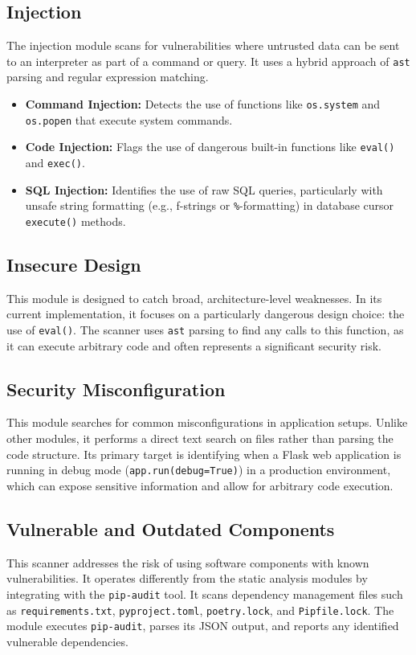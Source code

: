 \subsection{Injection}
The injection module scans for vulnerabilities where untrusted data can be sent to an interpreter as part of a command or query. It uses a hybrid approach of \texttt{ast} parsing and regular expression matching.
\begin{itemize}
    \item \textbf{Command Injection:} Detects the use of functions like \texttt{os.system} and \texttt{os.popen} that execute system commands.
    \item \textbf{Code Injection:} Flags the use of dangerous built-in functions like \texttt{eval()} and \texttt{exec()}.
    \item \textbf{SQL Injection:} Identifies the use of raw SQL queries, particularly with unsafe string formatting (e.g., f-strings or \texttt{\%}-formatting) in database cursor \texttt{execute()} methods.
\end{itemize}

\subsection{Insecure Design}
This module is designed to catch broad, architecture-level weaknesses. In its current implementation, it focuses on a particularly dangerous design choice: the use of \texttt{eval()}. The scanner uses \texttt{ast} parsing to find any calls to this function, as it can execute arbitrary code and often represents a significant security risk.

\subsection{Security Misconfiguration}
This module searches for common misconfigurations in application setups. Unlike other modules, it performs a direct text search on files rather than parsing the code structure. Its primary target is identifying when a Flask web application is running in debug mode (\texttt{app.run(debug=True)}) in a production environment, which can expose sensitive information and allow for arbitrary code execution.

\subsection{Vulnerable and Outdated Components}
This scanner addresses the risk of using software components with known vulnerabilities. It operates differently from the static analysis modules by integrating with the \texttt{pip-audit} tool. It scans dependency management files such as \texttt{requirements.txt}, \texttt{pyproject.toml}, \texttt{poetry.lock}, and \texttt{Pipfile.lock}. The module executes \texttt{pip-audit}, parses its JSON output, and reports any identified vulnerable dependencies.

